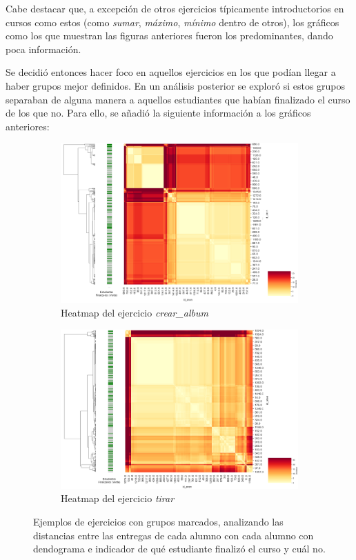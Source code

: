 \documentclass[11pt,a4paper,twoside,openany]{tesis}
\begin{document}
Cabe destacar que, a excepción de otros ejercicios típicamente introductorios en cursos como estos (como \emph{sumar}, \emph{máximo}, \emph{mínimo} dentro de otros), los gráficos como los que muestran las figuras anteriores fueron los predominantes, dando poca información. 

Se decidió entonces hacer foco en aquellos ejercicios en los que podían llegar a haber grupos mejor definidos. En un análisis posterior se exploró si estos grupos separaban de alguna manera a aquellos estudiantes que habían finalizado el curso de los que no. Para ello, se añadió la siguiente información a los gráficos anteriores:

\begin{figure}[H]
    \centering
    \begin{subfigure}{0.45\textwidth}
        \includegraphics[width=\linewidth]{imagenes/heatmap-2-crear album.png}
        \caption{Heatmap del ejercicio \emph{crear\_album}}
        \label{fig:figura1}
    \end{subfigure}
    \hfill
    \begin{subfigure}{0.45\textwidth}
        \includegraphics[width=\linewidth]{imagenes/heatmap-2-tirar.png}
        \caption{Heatmap del ejercicio \emph{tirar}}
        \label{fig:figura2}
    \end{subfigure}
    \caption{Ejemplos de ejercicios con grupos marcados, analizando las distancias entre las entregas de cada alumno con cada alumno con dendograma e indicador de qué estudiante finalizó el curso y cuál no.}
    \label{fig:figuras_juntas}
\end{figure}
\end{document}
